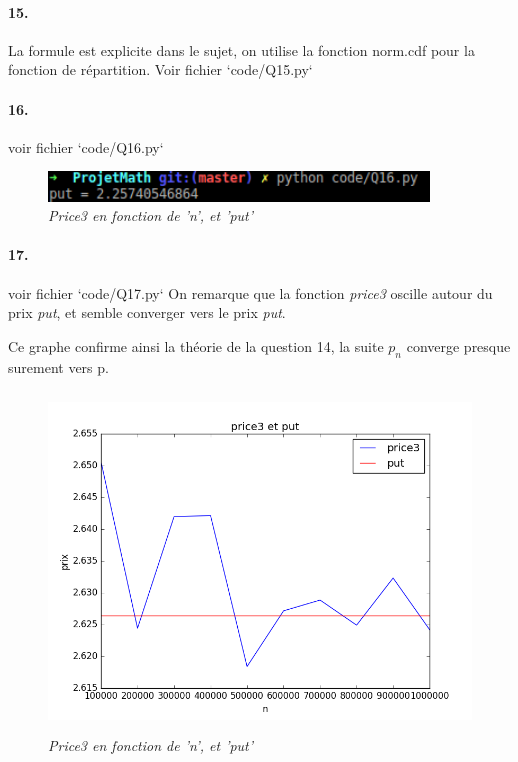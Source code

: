 \documentclass[10pt]{article}
\begin{document}
  \paragraph{15.} La formule est explicite dans le sujet, on utilise la fonction norm.cdf pour la fonction de répartition.
  Voir fichier `code/Q15.py`
  
  \paragraph{16.} voir fichier `code/Q16.py`
    \begin{figure}[H]
      \begin{center}
	\includegraphics[height=0.8cm,keepaspectratio]{./images/q16.png}
      \end{center}
      \caption{\textit{Price3 en fonction de 'n', et 'put'}}
      \label{q16}
    \end{figure}
    
  \paragraph{17.} voir fichier `code/Q17.py`
  On remarque que la fonction \textit{price3} oscille autour du prix \textit{put}, et semble converger vers le prix \textit{put}.
  
  
  Ce graphe confirme ainsi la théorie de la question 14, la suite $p_n$ converge presque surement vers p.
  \begin{figure}[H]
    \begin{center}
      \includegraphics[height=9cm,keepaspectratio]{./images/Q17.png}
    \end{center}
    \caption{\textit{Price3 en fonction de 'n', et 'put'}}
    \label{Q17}
  \end{figure}
  
\end{document}
